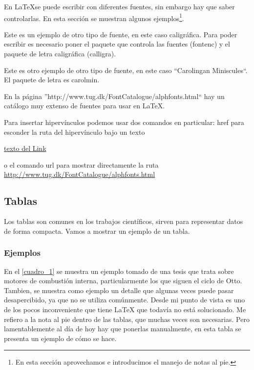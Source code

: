 \documentclass[a4paper,11pt]{article}
\begin{document}
En \LaTeX se puede escribir con diferentes fuentes, sin embargo hay que saber controlarlas. En esta sección se muestran algunos ejemplos\footnote{En esta sección aprovechamos e introducimos el manejo de notas al pie.}.

Este es un ejemplo de otro tipo de fuente, en este caso caligráfica. Para poder escribir es necesario poner el paquete que controla las fuentes (fontenc) y el paquete de letra caligráfica (calligra).

Este es otro ejemplo de otro tipo de fuente, en este caso ``Carolingan Miniscules``. El paquete de letra es carolmin.

\normalfont
En la página ''http://www.tug.dk/FontCatalogue/alphfonts.html`` hay un catálogo muy extenso de fuentes para usar en \LaTeX. 

Para insertar hipervínculos podemos usar dos comandos en particular: href para esconder la ruta del hipervínculo bajo un texto

\href{http://www.tug.dk/FontCatalogue/alphfonts.html}{texto del Link}

o el comando url para mostrar directamente la ruta
\url{http://www.tug.dk/FontCatalogue/alphfonts.html}

\subsection{Tablas}
Los tablas son comunes en los trabajos científicos, sirven para representar datos de forma compacta. Vamos a mostrar un ejemplo de un tabla.

\subsubsection{Ejemplos}
\label{ej_fonts}
En el \autoref{cuadro_1} se muestra un ejemplo tomado de una tesis que trata sobre motores de combustión interna, particularmente los que siguen el ciclo de Otto. Tambien, se muestra como ejemplo un detalle que algunas veces puede pasar desapercibido, ya que no se utiliza comúnmente. Desde mi punto de vista es uno de los pocos inconveniente que tiene LaTeX que todavía no está solucionado. Me refiero a la nota al pie dentro de las tablas, que muchas veces son necesarias. Pero lamentablemente al día de hoy hay que ponerlas manualmente, en esta tabla se presenta un ejemplo de cómo se hace.
\end{document}
